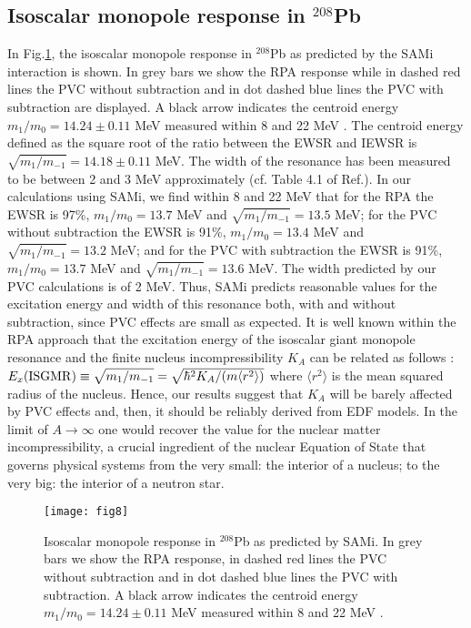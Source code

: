\documentclass[12pt,a4paper,final]{iopart}
\begin{document}
\subsection{Isoscalar monopole response in ${}^{208}$Pb} 

In Fig.\ref{fig8}, the isoscalar monopole response in ${}^{208}$Pb as predicted by the SAMi interaction is shown. In grey bars we show the RPA response while in dashed red lines the PVC without subtraction and in dot dashed blue lines the PVC with subtraction are displayed. A black arrow indicates the centroid energy $m_1/m_0=14.24\pm 0.11$ MeV measured within 8 and 22 MeV \cite{youngblood1999}. The centroid energy defined as the square root of the ratio between the EWSR and IEWSR is $\sqrt{m_1/m_{-1}}=14.18\pm 0.11$ MeV\cite{youngblood1999}. The width of the resonance has been measured to be between 2 and 3 MeV approximately (cf. Table 4.1 of Ref.\cite{harakeh2001}). In our calculations using SAMi, we find within 8 and 22 MeV that for the RPA the EWSR is 97\%, $m_1/m_0 = 13.7$ MeV and $\sqrt{m_1/m_{-1}} = 13.5$ MeV; for the PVC without subtraction  the EWSR is 91\%, $m_1/m_0 = 13.4$ MeV and $\sqrt{m_1/m_{-1}} = 13.2$ MeV; and for the PVC with subtraction the EWSR is 91\%, $m_1/m_0 = 13.7$ MeV and $\sqrt{m_1/m_{-1}} = 13.6$ MeV. The width predicted by our PVC calculations is of 2 MeV. Thus, SAMi predicts reasonable values for the excitation energy and width of this resonance both, with and without subtraction, since PVC effects are small as expected. It is well known within the RPA approach that the excitation energy of the isoscalar giant monopole resonance and the finite nucleus incompressibility $K_A$ can be related as follows \cite{khan2013}: $E_x({\rm ISGMR}) \equiv \sqrt{m_1/m_{-1}} = \sqrt{\hbar^2 K_A/(m\langle r^2\rangle)}$ where $\langle r^2\rangle$ is the mean squared radius of the nucleus. Hence, our results suggest that $K_A$ will be barely affected by PVC effects and, then, it should be reliably derived from EDF models. In the limit of $A\rightarrow\infty$ one would recover the value for the nuclear matter incompressibility, a crucial ingredient of the nuclear Equation of State that governs physical systems from the very small: the interior of a nucleus; to the very big: the interior of a neutron star.  

\begin{figure}[t!]                    
\centerline{\texttt{[image: fig8]}}
\caption{Isoscalar monopole response in ${}^{208}$Pb as predicted by SAMi. In grey bars we show the RPA response, in dashed red lines the PVC without subtraction and in dot dashed blue lines the PVC with subtraction. A black arrow indicates the centroid energy $m_1/m_0=14.24\pm 0.11$ MeV measured within 8 and 22 MeV \cite{youngblood1999}.} 
\label{fig8} 
\end{figure}
\end{document}
